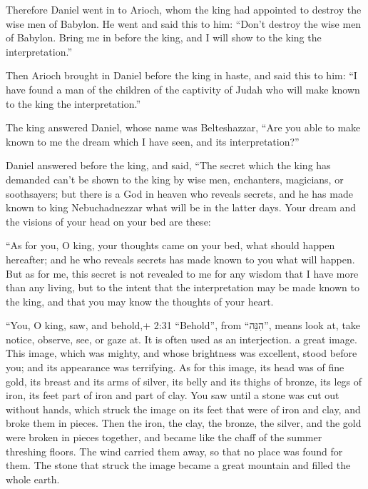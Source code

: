  Therefore Daniel went in to Arioch, whom the king had
appointed to destroy the wise men of Babylon. He went and said this to
him: ``Don't destroy the wise men of Babylon. Bring me in before the
king, and I will show to the king the interpretation.''

 Then Arioch brought in Daniel before the king in haste,
and said this to him: ``I have found a man of the children of the
captivity of Judah who will make known to the king the interpretation.''

 The king answered Daniel, whose name was Belteshazzar,
``Are you able to make known to me the dream which I have seen, and its
interpretation?''

 Daniel answered before the king, and said, ``The secret
which the king has demanded can't be shown to the king by wise men,
enchanters, magicians, or soothsayers;  but there is a God
in heaven who reveals secrets, and he has made known to king
Nebuchadnezzar what will be in the latter days. Your dream and the
visions of your head on your bed are these:

 ``As for you, O king, your thoughts came on your bed, what
should happen hereafter; and he who reveals secrets has made known to
you what will happen.  But as for me, this secret is not
revealed to me for any wisdom that I have more than any living, but to
the intent that the interpretation may be made known to the king, and
that you may know the thoughts of your heart.

 ``You, O king, saw, and behold,+ 2:31 ``Behold'', from
``הִנֵּה'', means look at, take notice, observe, see, or gaze at. It is
often used as an interjection. a great image. This image, which was
mighty, and whose brightness was excellent, stood before you; and its
appearance was terrifying.  As for this image, its head was
of fine gold, its breast and its arms of silver, its belly and its
thighs of bronze,  its legs of iron, its feet part of iron
and part of clay.  You saw until a stone was cut out
without hands, which struck the image on its feet that were of iron and
clay, and broke them in pieces.  Then the iron, the clay,
the bronze, the silver, and the gold were broken in pieces together, and
became like the chaff of the summer threshing floors. The wind carried
them away, so that no place was found for them. The stone that struck
the image became a great mountain and filled the whole earth.

